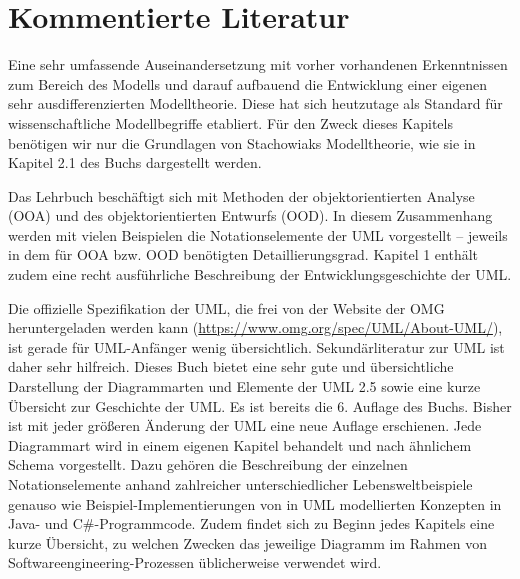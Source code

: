 \section{Kommentierte Literatur}
\label{sec:Kap-3.3}

{Eine sehr umfassende Auseinandersetzung mit vorher vorhandenen Erkenntnissen zum Bereich des Modells und darauf aufbauend die Entwicklung einer eigenen sehr ausdifferenzierten Modelltheorie. Diese hat sich heutzutage als Standard für wissenschaftliche Modellbegriffe etabliert. Für den Zweck dieses Kapitels benötigen wir nur die Grundlagen von Stachowiaks Modelltheorie, wie sie in Kapitel 2.1 des Buchs dargestellt werden.
}

{Das Lehrbuch beschäftigt sich mit Methoden der objektorientierten Analyse (OOA) und des objektorientierten Entwurfs (OOD). In diesem Zusammenhang werden mit vielen Beispielen die Notationselemente der UML vorgestellt – jeweils in dem für OOA bzw. OOD benötigten Detaillierungsgrad. Kapitel 1 enthält zudem eine recht ausführliche Beschreibung der Entwicklungsgeschichte der UML.}

{Die offizielle Spezifikation der UML, die frei von der Website der OMG heruntergeladen werden kann (\url{https://www.omg.org/spec/UML/About-UML/}), ist gerade für UML-Anfänger wenig übersichtlich. Sekundärliteratur zur UML ist daher sehr hilfreich. Dieses Buch bietet eine sehr gute und übersichtliche Darstellung der Diagrammarten und Elemente der UML 2.5 sowie eine kurze Übersicht zur Geschichte der UML. Es ist bereits die 6. Auflage des Buchs. Bisher ist mit jeder größeren Änderung der UML eine neue Auflage erschienen. Jede Diagrammart wird in einem eigenen Kapitel behandelt und nach ähnlichem Schema vorgestellt. Dazu gehören die Beschreibung der einzelnen Notationselemente anhand zahlreicher unterschiedlicher Lebensweltbeispiele genauso wie Beispiel-Implementierungen von in UML modellierten Konzepten in Java- und C\#-Programmcode. Zudem findet sich zu Beginn jedes Kapitels eine kurze Übersicht, zu welchen Zwecken das jeweilige Diagramm im Rahmen von Softwareengineering-Prozessen üblicherweise verwendet wird.}

